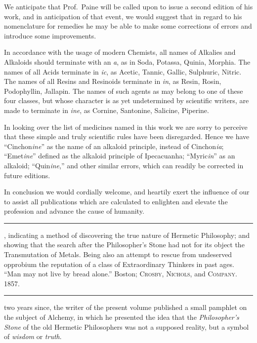 
We anticipate that Prof.\ Paine will be called upon to issue a second
edition of his work, and in anticipation of that event, we would suggest
that in regard to his nomenclature for remedies he may be able to
make some corrections of errors and introduce some improvements.

In accordance with the usage of modern Chemists, all names of
Alkalies and Alkaloids should terminate with an \emph{a}, as in Soda, Potassa,
Quinia, Morphia. The names of all Acids terminate in \emph{ic}, as Acetic,
Tannic, Gallic, Sulphuric, Nitric. The names of all Resins and Resinoids
terminate in \emph{in}, as Resin, Rosin, Podophyllin, Jallapin. The
names of such agents as may belong to one of these four classes, but
whose character is as yet undetermined by scientific writers, are made
to terminate in \emph{ine}, as Cornine, Santonine, Salicine, Piperine.

In looking over the list of medicines named in this work we are sorry
to perceive that these simple and truly scientific rules have been disregarded.
Hence we have ``Cinchon\textit{ine}'' as the name of an alkaloid
principle, instead of Cinchon\textit{ia}; ``Emet\textit{ine}'' defined as the alkaloid
principle of Ipecacuanha; ``Myric\textit{in}'' as an alkaloid; ``Quin\textit{ine},''
and other similar errors, which can readily be corrected in future editions.

In conclusion we would cordially welcome, and heartily exert the influence
of our  to assist all publications which are calculated to
enlighten and elevate the profession and advance the cause of humanity.

\fancybreak{* * *}

\footnotesize
{}, indicating a method of discovering the true
nature of Hermetic Philosophy; and showing that the search after the Philosopher's
Stone had not for its object the Transmutation of Metals. Being also an attempt to
rescue from undeserved opprobium the reputation of a class of Extraordinary Thinkers
in past ages. ``Man may not live by bread alone.'' Boston; \textsc{Crosby}, \textsc{Nichols}, and
\textsc{Company}. 1857.
\plainbreak{1}
\normalsize


 two years since, the writer of the present volume published a
small pamphlet on the subject of Alchemy, in which he presented the
idea that the \emph{Philosopher's Stone} of the old Hermetic Philosophers
was not a supposed reality, but a symbol of \emph{wisdom} or \emph{truth}.

